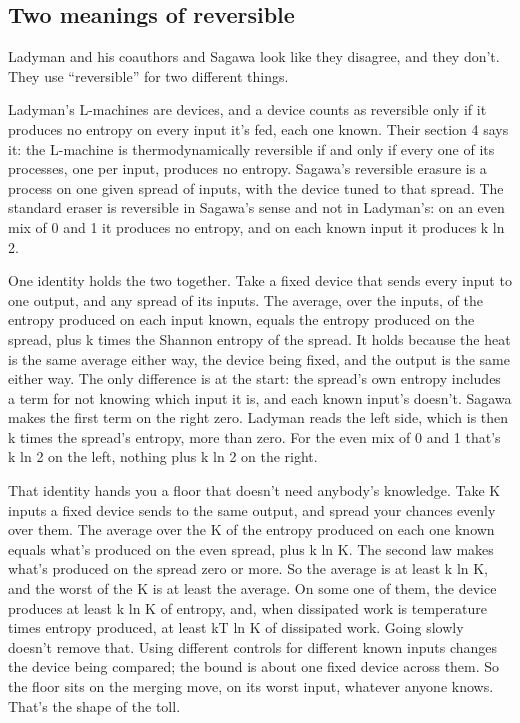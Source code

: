 \documentclass[11pt,twoside]{article}
\theoremstyle{thielethm}
\theoremstyle{thieledef}
\theoremstyle{thieledef}
\theoremstyle{thieledef}
\theoremstyle{thielethm}
\theoremstyle{thieleobs}
\theoremstyle{thielethm}
\begin{document}
\subsection{Two meanings of reversible}

Ladyman and his coauthors and Sagawa look like they disagree, and they don't. They use ``reversible'' for two different things.

Ladyman's L-machines are devices, and a device counts as reversible only if it produces no entropy on every input it's fed, each one known. Their section 4 says it: the L-machine is thermodynamically reversible if and only if every one of its processes, one per input, produces no entropy. Sagawa's reversible erasure is a process on one given spread of inputs, with the device tuned to that spread. The standard eraser is reversible in Sagawa's sense and not in Ladyman's: on an even mix of 0 and 1 it produces no entropy, and on each known input it produces k ln 2.

One identity holds the two together. Take a fixed device that sends every input to one output, and any spread of its inputs. The average, over the inputs, of the entropy produced on each input known, equals the entropy produced on the spread, plus k times the Shannon entropy of the spread. It holds because the heat is the same average either way, the device being fixed, and the output is the same either way. The only difference is at the start: the spread's own entropy includes a term for not knowing which input it is, and each known input's doesn't. Sagawa makes the first term on the right zero. Ladyman reads the left side, which is then k times the spread's entropy, more than zero. For the even mix of 0 and 1 that's k ln 2 on the left, nothing plus k ln 2 on the right.

That identity hands you a floor that doesn't need anybody's knowledge. Take K inputs a fixed device sends to the same output, and spread your chances evenly over them. The average over the K of the entropy produced on each one known equals what's produced on the even spread, plus k ln K. The second law makes what's produced on the spread zero or more. So the average is at least k ln K, and the worst of the K is at least the average. On some one of them, the device produces at least k ln K of entropy, and, when dissipated work is temperature times entropy produced, at least kT ln K of dissipated work. Going slowly doesn't remove that. Using different controls for different known inputs changes the device being compared; the bound is about one fixed device across them. So the floor sits on the merging move, on its worst input, whatever anyone knows. That's the shape of the toll.
\end{document}
